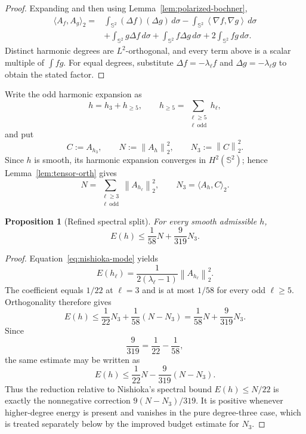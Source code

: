 \documentclass[11pt,reqno]{amsart}
\newtheorem{proposition}[theorem]{Proposition}
\theoremstyle{remark}
\newcommand{\Sph}{\mathbb S^2}
\newcommand{\dd}{\,d\sigma}
\newcommand{\ip}[2]{\left\langle #1,#2\right\rangle}
\newcommand{\norm}[1]{\left\lVert #1\right\rVert}
\begin{document}
\begin{proof}
Expanding and then using Lemma~\ref{lem:polarized-bochner},
\begin{align*}
 \langle A_f,A_g\rangle_2
 ={}&\int_{\Sph}(\Delta f)(\Delta g)\dd
 -\int_{\Sph}\ip{\nabla f}{\nabla g}\dd\\
 &+\int_{\Sph}g\Delta f\dd
 +\int_{\Sph}f\Delta g\dd
 +2\int_{\Sph}fg\dd.
\end{align*}
Distinct harmonic degrees are $L^2$-orthogonal, and every term above is a
scalar multiple of $\int fg$. For equal degrees, substitute
$\Delta f=-\lambda_\ell f$ and $\Delta g=-\lambda_\ell g$ to obtain the stated
factor.
\end{proof}

Write the odd harmonic expansion as
\[
 h=h_3+h_{\ge5},
 \qquad
 h_{\ge5}=\sum_{\substack{\ell\ge5\\ \ell\ \mathrm{odd}}}h_\ell,
\]
and put
\[
 C:=A_{h_3},\qquad N:=\norm{A_h}_2^2,\qquad N_3:=\norm{C}_2^2.
\]
Since $h$ is smooth, its harmonic expansion converges in $H^2(\Sph)$; hence
Lemma~\ref{lem:tensor-orth} gives
\begin{equation}\label{eq:projection}
 N=\sum_{\substack{\ell\ge3\\ \ell\ \mathrm{odd}}}
   \norm{A_{h_\ell}}_2^2,
 \qquad
 N_3=\langle A_h,C\rangle_2.
\end{equation}

\begin{proposition}[Refined spectral split]\label{prop:spectral-split}
For every smooth admissible $h$,
\begin{equation}\label{eq:spectral-split}
 E(h)\le \frac1{58}N+\frac9{319}N_3.
\end{equation}
\end{proposition}

\begin{proof}
Equation~\eqref{eq:nishioka-mode} yields
\[
 E(h_\ell)=\frac{1}{2(\lambda_\ell-1)}
 \norm{A_{h_\ell}}_2^2.
\]
The coefficient equals $1/22$ at $\ell=3$ and is at most $1/58$ for every odd
$\ell\ge5$. Orthogonality therefore gives
\[
 E(h)\le \frac1{22}N_3+\frac1{58}(N-N_3)
 =\frac1{58}N+\frac9{319}N_3.
\]
Since
\[
 \frac9{319}=\frac1{22}-\frac1{58},
\]
the same estimate may be written as
\[
 E(h)\le \frac1{22}N-\frac9{319}(N-N_3).
\]
Thus the reduction relative to Nishioka's spectral bound $E(h)\le N/22$ is
exactly the nonnegative correction $9(N-N_3)/319$. It is positive whenever
higher-degree energy is present and vanishes in the pure degree-three case,
which is treated separately below by the improved budget estimate for $N_3$.
\end{proof}
\end{document}
